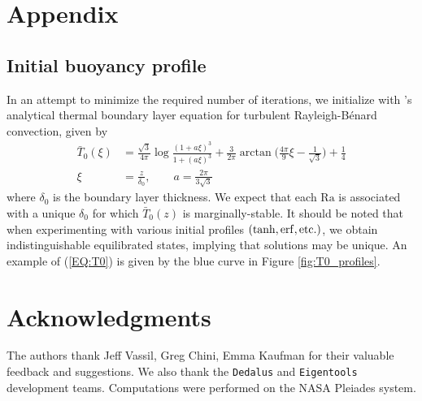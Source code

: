 \documentclass[reprint,amsmath,amssymb,aps]{revtex4-1}
\newcommand\Ra{\mathrm{Ra}}
\begin{document}
\section*{Appendix}
\subsection{Initial buoyancy profile} \label{sec:initial_profile}
In an attempt to minimize the required number of iterations, we initialize with \cite{Shishkina}'s analytical thermal boundary layer equation for turbulent Rayleigh-B\'enard convection, given by 
\begin{align}
    \bar{T}_0(\xi) &= \frac{\sqrt{3}}{4\pi} \log \frac{(1 + a\xi)^3}{1 + (a\xi)^3} + \frac{3}{2\pi} \arctan \Big( \frac{4\pi}{9}\xi - \frac{1}{\sqrt{3}} \Big) + \frac{1}{4} \nonumber \\
    \xi &= \frac{z}{\delta_0}, \qquad a = \frac{2\pi}{3\sqrt{3}}\label{EQ:T0}
\end{align}
where $\delta_0$ is the boundary layer thickness. 
We expect that each $\Ra$ is associated with a unique $\delta_0$ for which $\bar{T}_0(z)$ is marginally-stable. 
It should be noted that when experimenting with various initial profiles $(\tanh, \rm{erf}, \rm{etc.})$, we obtain indistinguishable equilibrated states, implying that solutions may be unique. 
An example of (\ref{EQ:T0}) is given by the blue curve in Figure \ref{fig:T0_profiles}.

\section*{Acknowledgments}
The authors thank Jeff Vassil, Greg Chini, Emma Kaufman for their valuable feedback and suggestions. 
We also thank the \texttt{Dedalus} and \texttt{Eigentools} development teams. 
Computations were performed on the NASA Pleiades system.


% 

\end{document}
